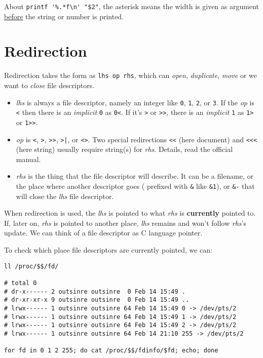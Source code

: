 About \lstinline|printf '%.*f\n' "$2"|, the asterisk means the width
is given as argument
\href{https://wiki.bash-hackers.org/commands/builtin/printf?s\%5b\%5d=printf}{before}
the string or number is printed.

\section{Redirection}
\label{sec:bash-redirection}

Redirection takes the form as \verb|lhs op rhs|, which can
\textit{open}, \textit{duplicate}, \textit{move} or we want to
\textit{close} file descriptors.

\begin{itemize}
\item \textit{lhs} is always a file descriptor, namely an integer
  like \verb|0|, \verb|1|, \verb|2|, or \verb|3|. If the
  \textit{op} is \verb|<| then there is an \textit{implicit}
  \verb|0| as \verb|0<|. If it's \verb|>| or \verb|>>|, there is
  an \textit{implicit} \verb|1| as \verb|1>| or \verb|1>>|.
\item \textit{op} is \verb|<|, \verb|>|, \verb|>>|, \verb/>|/, or
  \verb|<>|. Two special redirections \verb|<<| (here document)
  and \verb|<<<| (here string) usually require string(s) for
  \textit{rhs}. Details, read the official manual.
\item \textit{rhs} is the thing that the file descriptor will
  describe. It can be a filename, or the place where another
  descriptor goes ( prefixed with \verb|&| like \lstinline|&1|),
  or \lstinline|&-| that will close the \textit{lhs} file
  descriptor.
\end{itemize}

When redirection is used, the \textit{lhs} is pointed to what
\textit{rhs} is \textbf{currently} pointed to. If, later on,
\textit{rhs} is pointed to another place, \textit{lhs} remains and
won't follow \textit{rhs}'s update. We can think of a file
descriptor as C language pointer.

To check which place file descriptors are currently pointed, we
can:

\begin{lstlisting}
ll /proc/$$/fd/

# total 0
# dr-x------ 2 outsinre outsinre  0 Feb 14 15:49 .
# dr-xr-xr-x 9 outsinre outsinre  0 Feb 14 15:49 ..
# lrwx------ 1 outsinre outsinre 64 Feb 14 15:49 0 -> /dev/pts/2
# lrwx------ 1 outsinre outsinre 64 Feb 14 15:49 1 -> /dev/pts/2
# lrwx------ 1 outsinre outsinre 64 Feb 14 15:49 2 -> /dev/pts/2
# lrwx------ 1 outsinre outsinre 64 Feb 14 21:10 255 -> /dev/pts/2

for fd in 0 1 2 255; do cat /proc/$$/fdinfo/$fd; echo; done
\end{lstlisting}


